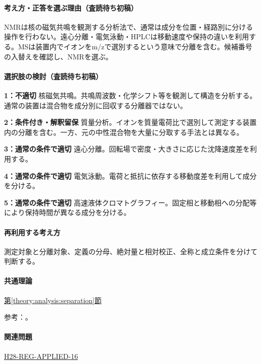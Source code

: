 \paragraph{考え方・正答を選ぶ理由（査読待ち初稿）} NMRは核の磁気共鳴を観測する分析法で、通常は成分を位置・経路別に分ける操作を行わない。遠心分離・電気泳動・HPLCは移動速度や保持の違いを利用する。MSは装置内でイオンをm/zで選別するという意味で分離を含む。候補番号の入替えを確認し、NMRを選ぶ。

\paragraph{選択肢の検討（査読待ち初稿）}\mbox{}\par

\noindent\textbf{1：不適切} 核磁気共鳴。共鳴周波数・化学シフト等を観測して構造を分析する。通常の装置は混合物を成分別に回収する分離器ではない。\par

\noindent\textbf{2：条件付き・解釈留保} 質量分析。イオンを質量電荷比で選別して測定する装置内の分離を含む。一方、元の中性混合物を大量に分取する手法とは異なる。\par

\noindent\textbf{3：通常の条件で適切} 遠心分離。回転場で密度・大きさに応じた沈降速度差を利用する。\par

\noindent\textbf{4：通常の条件で適切} 電気泳動。電荷と抵抗に依存する移動度差を利用して成分を分ける。\par

\noindent\textbf{5：通常の条件で適切} 高速液体クロマトグラフィー。固定相と移動相への分配等により保持時間が異なる成分を分ける。\par

\paragraph{再利用する考え方} 測定対象と分離対象、定義の分母、絶対量と相対校正、全称と成立条件を分けて判断する。

\paragraph{共通理論} \hyperref[theory:analysis:separation]{第\ref*{theory:analysis:separation}節}

\par 参考：\cite{analysis49_ms_ref}。

\paragraph{関連問題} \hyperref[q:h28-reg-applied-16]{H28-REG-APPLIED-16}

